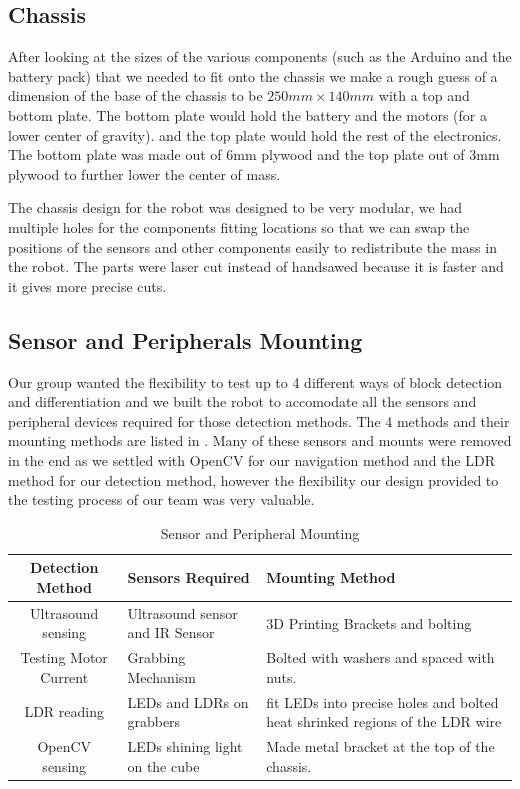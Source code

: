 \documentclass{article}
\begin{document}
\subsection{Chassis}
\quad After looking at the sizes of the various components (such as the Arduino and the battery pack) that we needed to fit onto the chassis we make a rough guess of a dimension of the base of the chassis to be $250mm \times 140mm$ with a top and bottom plate. The bottom plate would hold the battery and the motors (for a lower center of gravity). and the top plate would hold the rest of the electronics. The bottom plate was made out of 6mm plywood and the top plate out of 3mm plywood to further lower the center of mass.

The chassis design for the robot was designed to be very modular, we had multiple holes for the components fitting locations so that we can swap the positions of the sensors and other components easily to redistribute the mass in the robot. The parts were laser cut instead of handsawed because it is faster and it gives more precise cuts.

\subsection{Sensor and Peripherals Mounting}
\quad Our group wanted the flexibility to test up to 4 different ways of block detection and differentiation and we built the robot to accomodate all the sensors and peripheral devices required for those detection methods. The 4 methods and their mounting methods are listed in . Many of these sensors and mounts were removed in the end as we settled with OpenCV for our navigation method and the LDR method for our detection method, however the flexibility our design provided to the testing process of our team was very valuable.

\begin{table}[]
    \centering
    \begin{tabular}{|c|p{5cm}|p{5cm}|}
        \hline
        Detection Method & Sensors Required & Mounting Method \\
        \hline
        Ultrasound sensing & Ultrasound sensor and IR Sensor & 3D Printing Brackets and bolting \\
        \hline
        Testing Motor Current & Grabbing Mechanism & Bolted with washers and spaced with nuts.\\
        \hline
        LDR reading & LEDs and LDRs on grabbers & fit LEDs into precise holes and bolted heat shrinked regions of the LDR wire \\
        \hline
        OpenCV sensing & LEDs shining light on the cube & Made metal bracket at the top of the chassis.\\
        \hline
    \end{tabular}
    \caption{Sensor and Peripheral Mounting}
    \label{tab:mount_sens}
\end{table}
\end{document}
